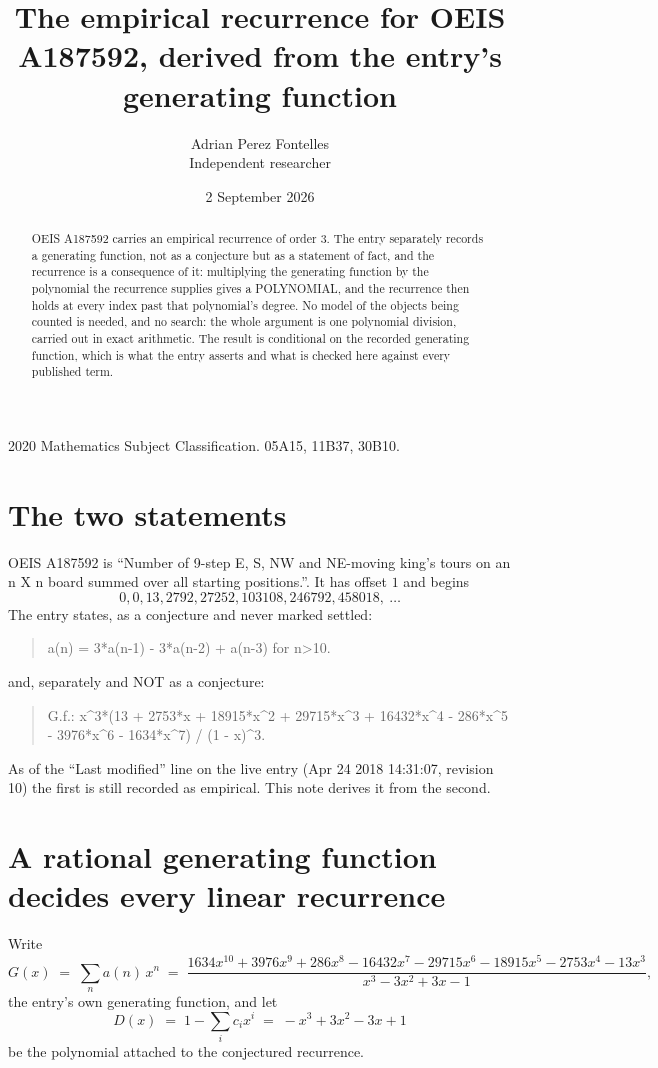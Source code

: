 \documentclass[11pt,a4paper]{article}
\title{The empirical recurrence for OEIS A187592, derived from the entry's generating function}
\author{Adrian Perez Fontelles\\ \small Independent researcher}
\date{2 September 2026}
\theoremstyle{plain}
\theoremstyle{definition}
\begin{document}
\maketitle

\begin{abstract}
OEIS A187592 carries an empirical recurrence of order $3$. The entry separately records a
generating function, not as a conjecture but as a statement of fact, and the recurrence is a
consequence of it: multiplying the generating function by the polynomial the recurrence
supplies gives a POLYNOMIAL, and the recurrence then holds at every index past that
polynomial's degree. No model of the objects being counted is needed, and no search: the
whole argument is one polynomial division, carried out in exact arithmetic. The result is
conditional on the recorded generating function, which is what the entry asserts and what is
checked here against every published term.
\end{abstract}

\noindent\small 2020 Mathematics Subject Classification. 05A15, 11B37, 30B10.\normalsize

\section{The two statements}

OEIS A187592 is ``Number of 9-step E, S, NW and NE-moving king's tours on an n X n board summed over all starting positions.''. It has offset $1$ and begins
\[
0, 0, 13, 2792, 27252, 103108, 246792, 458018,\ \dots
\]
The entry states, as a conjecture and never marked settled:
\begin{quote}
a(n) = 3*a(n-1) - 3*a(n-2) + a(n-3) for n>10.
\end{quote}
and, separately and NOT as a conjecture:
\begin{quote}
G.f.: x\^{}3*(13 + 2753*x + 18915*x\^{}2 + 29715*x\^{}3 + 16432*x\^{}4 - 286*x\^{}5 - 3976*x\^{}6 - 1634*x\^{}7) / (1 - x)\^{}3.
\end{quote}
As of the ``Last modified'' line on the live entry (Apr 24 2018 14:31:07, revision 10) the first is still
recorded as empirical. This note derives it from the second.

\section{A rational generating function decides every linear recurrence}

Write
\[
G(x)\;=\;\sum_{n}a(n)\,x^{n}\;=\;\frac{1634 x^{10} + 3976 x^{9} + 286 x^{8} - 16432 x^{7} - 29715 x^{6} - 18915 x^{5} - 2753 x^{4} - 13 x^{3}}{x^{3} - 3 x^{2} + 3 x - 1},
\]
the entry's own generating function, and let
\[
D(x)\;=\;1-\sum_i c_i x^{i}\;=\;- x^{3} + 3 x^{2} - 3 x + 1
\]
be the polynomial attached to the conjectured recurrence.
\end{document}
